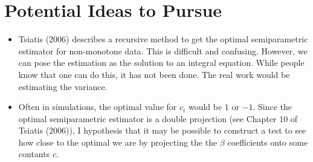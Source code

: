 \documentclass[12pt]{article}
\begin{document}
\section*{Potential Ideas to Pursue}

\begin{itemize}
  \item Tsiatis (2006) describes a recursive method to get the optimal 
    semiparametric estimator for non-monotone data. This is difficult and 
    confusing. However, we can pose the estimation as the solution to an 
    integral equation. While people know that one can do this, it has not 
    been done. The real work would be estimating the variance.
  \item Often in simulations, the optimal value for $c_i$ would be $1$ or 
    $-1$. Since the optimal semiparametric estimator is a double projection
    (see Chapter 10 of Tsiatis (2006)), I hypothesis that it may be possible to
    construct a test to see how close to the optimal we are by projecting 
    the the $\beta$ coefficients onto some contants $c$.
\end{itemize}
\end{document}
